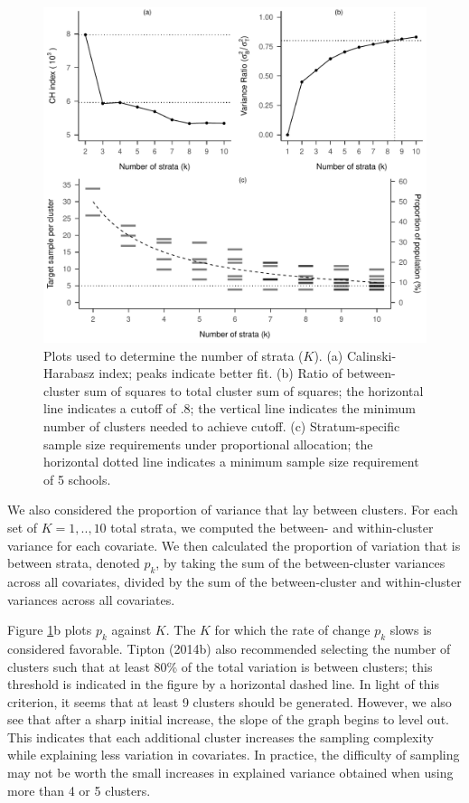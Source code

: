\documentclass[
  english,
  man,floatsintext]{apa6}
\begin{document}
\begin{figure}[p]
\includegraphics[width=1\linewidth]{6---Paper_files/figure-latex/fig-k-plots-1} \caption{Plots used to determine the number of strata (\(K\)). (a) Calinski-Harabasz index; peaks indicate better fit. (b) Ratio of between-cluster sum of squares to total cluster sum of squares; the horizontal line indicates a cutoff of .8; the vertical line indicates the minimum number of clusters needed to achieve cutoff. (c) Stratum-specific sample size requirements under proportional allocation; the horizontal dotted line indicates a minimum sample size requirement of 5 schools. }\label{fig:fig-k-plots}
\end{figure}

We also considered the proportion of variance that lay between clusters. For each set of \(K = 1,..,10\) total strata, we computed the between- and within-cluster variance for each covariate. We then calculated the proportion of variation that is between strata, denoted \(p_k\), by taking the sum of the between-cluster variances across all covariates, divided by the sum of the between-cluster and within-cluster variances across all covariates.

Figure \ref{fig:fig-k-plots}b plots \(p_k\) against \(K\). The \(K\) for which the rate of change \(p_k\) slows is considered favorable. Tipton (2014b) also recommended selecting the number of clusters such that at least 80\% of the total variation is between clusters; this threshold is indicated in the figure by a horizontal dashed line. In light of this criterion, it seems that at least 9 clusters should be generated. However, we also see that after a sharp initial increase, the slope of the graph begins to level out. This indicates that each additional cluster increases the sampling complexity while explaining less variation in covariates. In practice, the difficulty of sampling may not be worth the small increases in explained variance obtained when using more than 4 or 5 clusters.
\end{document}
